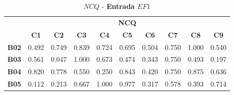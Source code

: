 \begin{table}[htbp]
	\centering
	\caption{$NCQ$ - \textbf{Entrada $EF1$}}
	\begin{tabular}{|c|ccccccccc|}
		\hline
		\rowcolor[HTML]{D0CECE} 
		\cellcolor[HTML]{D0CECE} & \multicolumn{9}{c|}{\cellcolor[HTML]{D0CECE}\textbf{NCQ}} \\ \cline{2-10} 
		\rowcolor[HTML]{D0CECE} 
		\multirow{-2}{*}{\cellcolor[HTML]{D0CECE}\textbf{Part.}} & \multicolumn{1}{c|}{\cellcolor[HTML]{D0CECE}\textbf{C1}} & \multicolumn{1}{c|}{\cellcolor[HTML]{D0CECE}\textbf{C2}} & \multicolumn{1}{c|}{\cellcolor[HTML]{D0CECE}\textbf{C3}} & \multicolumn{1}{c|}{\cellcolor[HTML]{D0CECE}\textbf{C4}} & \multicolumn{1}{c|}{\cellcolor[HTML]{D0CECE}\textbf{C5}} & \multicolumn{1}{c|}{\cellcolor[HTML]{D0CECE}\textbf{C6}} & \multicolumn{1}{c|}{\cellcolor[HTML]{D0CECE}\textbf{C7}} & \multicolumn{1}{c|}{\cellcolor[HTML]{D0CECE}\textbf{C8}} & \textbf{C9} \\ \hline
		\textbf{B02} & \multicolumn{1}{c|}{0.492} & \multicolumn{1}{c|}{0.749} & \multicolumn{1}{c|}{0.839} & \multicolumn{1}{c|}{0.724} & \multicolumn{1}{c|}{0.695} & \multicolumn{1}{c|}{0.504} & \multicolumn{1}{c|}{0.750} & \multicolumn{1}{c|}{1.000} & 0.540 \\ \hline
		\rowcolor[HTML]{F2F2F2} 
		\textbf{B03} & \multicolumn{1}{c|}{\cellcolor[HTML]{F2F2F2}0.561} & \multicolumn{1}{c|}{\cellcolor[HTML]{F2F2F2}0.047} & \multicolumn{1}{c|}{\cellcolor[HTML]{F2F2F2}1.000} & \multicolumn{1}{c|}{\cellcolor[HTML]{F2F2F2}0.673} & \multicolumn{1}{c|}{\cellcolor[HTML]{F2F2F2}0.474} & \multicolumn{1}{c|}{\cellcolor[HTML]{F2F2F2}0.343} & \multicolumn{1}{c|}{\cellcolor[HTML]{F2F2F2}0.750} & \multicolumn{1}{c|}{\cellcolor[HTML]{F2F2F2}0.493} & 0.197 \\ \hline
		\textbf{B04} & \multicolumn{1}{c|}{0.820} & \multicolumn{1}{c|}{0.778} & \multicolumn{1}{c|}{0.550} & \multicolumn{1}{c|}{0.250} & \multicolumn{1}{c|}{0.843} & \multicolumn{1}{c|}{0.420} & \multicolumn{1}{c|}{0.750} & \multicolumn{1}{c|}{0.875} & 0.636 \\ \hline
		\rowcolor[HTML]{F2F2F2} 
		\textbf{B05} & \multicolumn{1}{c|}{\cellcolor[HTML]{F2F2F2}0.112} & \multicolumn{1}{c|}{\cellcolor[HTML]{F2F2F2}0.213} & \multicolumn{1}{c|}{\cellcolor[HTML]{F2F2F2}0.667} & \multicolumn{1}{c|}{\cellcolor[HTML]{F2F2F2}1.000} & \multicolumn{1}{c|}{\cellcolor[HTML]{F2F2F2}0.977} & \multicolumn{1}{c|}{\cellcolor[HTML]{F2F2F2}0.317} & \multicolumn{1}{c|}{\cellcolor[HTML]{F2F2F2}0.578} & \multicolumn{1}{c|}{\cellcolor[HTML]{F2F2F2}0.393} & 0.714 \\ \hline

\end{tabular}
\end{table}
